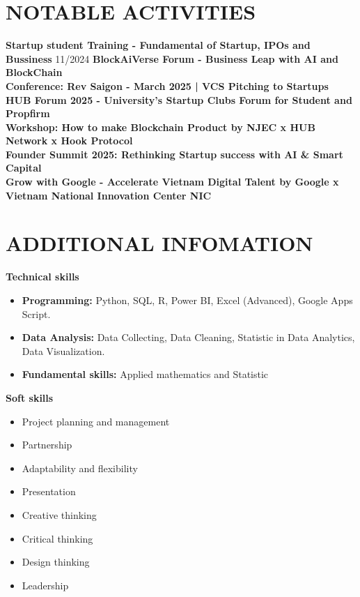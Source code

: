\documentclass[12pt,a4paper]{article}
\begin{document}
\section{NOTABLE ACTIVITIES}
\textbf{Startup student Training - Fundamental of Startup, IPOs and Bussiness} \hfill 11/2024 
\textbf{BlockAiVerse Forum - Business Leap with AI and BlockChain}\\
\textbf{Conference: Rev Saigon - March 2025 | VCS Pitching to Startups}\\
\textbf{HUB Forum 2025 - University's Startup Clubs Forum for Student and Propfirm}\\
\textbf{Workshop: How to make Blockchain Product by NJEC x HUB Network x Hook Protocol}\\
\textbf{Founder Summit 2025: Rethinking Startup success with AI & Smart Capital}\\
\textbf{Grow with Google - Accelerate Vietnam Digital Talent by Google x Vietnam National Innovation Center NIC}\\


\section{ADDITIONAL INFOMATION}
\noindent \textbf{Technical skills}

    \begin{itemize}[leftmargin=*, noitemsep]

        \item \textbf{Programming:} Python, SQL, R, Power BI, Excel (Advanced), Google Apps Script.
        
        \item \textbf{Data Analysis:} Data Collecting, Data Cleaning, Statistic in Data Analytics, Data Visualization.
        
        \item \textbf{Fundamental skills:} Applied mathematics and Statistic

    \end{itemize}


\noindent \textbf{Soft skills} 
    \begin{itemize}
        \item Project planning and management
        \item Partnership
        \item Adaptability and flexibility
        \item Presentation
        \item Creative thinking
        \item Critical thinking
        \item Design thinking
        \item Leadership
    \end{itemize}
\end{document}
